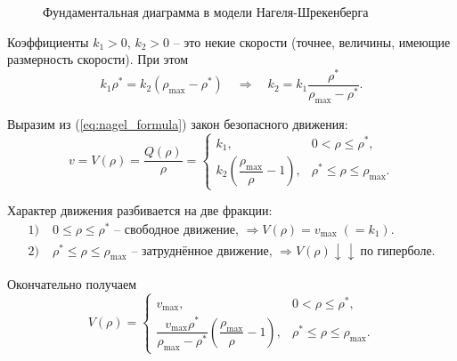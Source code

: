 \documentclass[12pt,a4paper]{article}
\begin{document}
\begin{figure}
\centering
{}
\caption{Фундаментальная диаграмма в модели Нагеля-Шрекенберга}
\label{fig:nagel_diagram_tikhonov}
\end{figure}

Коэффициенты \(k_1>0\), \(k_2>0\) -- это некие скорости
(точнее, величины, имеющие размерность скорости). При этом
\[
k_1 \rho^* = k_2(\rho_{\max}-\rho^*)
\quad \Longrightarrow \quad
k_2 = k_1 \frac{\rho^*}{\rho_{\max}-\rho^*}.
\]

Выразим из (\ref{eq:nagel_formula}) закон безопасного движения:
\[
v = V(\rho) = \frac{Q(\rho)}{\rho} =
\begin{cases}
k_1, & 0 < \rho \le \rho^*, \\[6pt]
k_2\left(\dfrac{\rho_{\max}}{\rho}-1\right), & \rho^* \le \rho \le \rho_{\max}.
\end{cases}
\]

Характер движения разбивается на две фракции:
\[
\begin{aligned}
1)\;& 0 \le \rho \le \rho^*
\text{ -- свободное движение, }
\Longrightarrow V(\rho)=v_{\max}\;(=k_1). \\[4pt]
2)\;& \rho^* \le \rho \le \rho_{\max}
\text{ -- затруднённое движение, }
\Longrightarrow V(\rho)\downarrow\downarrow\ \text{по гиперболе.}
\end{aligned}
\]

Окончательно получаем
\[
V(\rho)=
\begin{cases}
v_{\max}, & 0 < \rho \le \rho^*, \\[8pt]
\dfrac{v_{\max}\rho^*}{\rho_{\max}-\rho^*}
\left(\dfrac{\rho_{\max}}{\rho}-1\right),
& \rho^* \le \rho \le \rho_{\max}.
\end{cases}
\]
\end{document}
